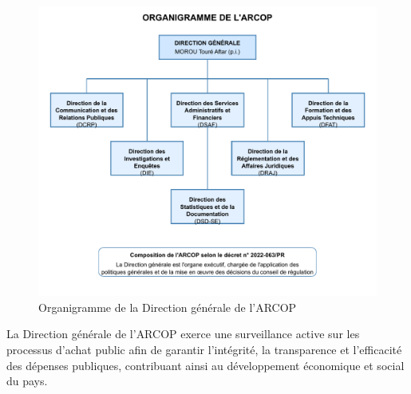 \begin{figure}[H]
    \centering
    \includegraphics[width=\textwidth]{images/diagrammes/autres/organigramme-arcop.pdf}
    \caption{Organigramme de la Direction générale de l'\ac{ARCOP}}
    \label{fig:organigramme-arcop}
\end{figure}

La Direction générale de l’\ac{ARCOP} exerce une surveillance active sur les processus d'achat public afin de garantir l'intégrité, la transparence et l'efficacité des dépenses publiques, contribuant ainsi au développement économique et social du pays.



\clearpage